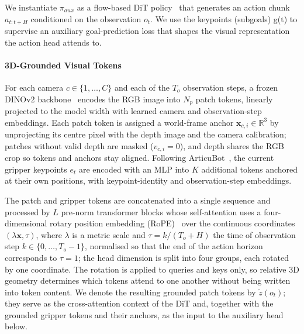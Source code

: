\documentclass[letterpaper, 10 pt, conference]{ieeeconf}  %
\begin{document}
We instantiate $\pi_{aux}$ as a flow-based DiT policy~\cite{dit,flowmatching,groot} that generates an action chunk $a_{t:t+H}$ conditioned on the observation $o_t$. We use the keypoints (subgoals) g(t) to supervise an auxiliary goal-prediction loss that shapes the visual representation the action head attends to. 

\paragraph{\textbf{3D-Grounded Visual Tokens}}
For each camera $c\in\{1,\dots,C\}$ and each of the $T_o$ observation steps, a frozen DINOv2
backbone~\cite{dinov2} encodes the RGB image into $N_p$ patch tokens, linearly
projected to the model width with learned camera and observation-step
embeddings. Each patch token is assigned a world-frame anchor
$\mathbf{x}_{c,i}\in\mathbb{R}^3$ by unprojecting its centre pixel with the
depth image and the camera calibration; patches without valid depth are masked
($v_{c,i}=0$), and depth shares the RGB crop so tokens and anchors stay
aligned. Following ArticuBot~\cite{articubot}, the current gripper keypoints
$e_t$ are encoded with an MLP into $K$ additional tokens anchored at their own
positions, with keypoint-identity and observation-step embeddings.

The patch and gripper tokens are concatenated into a single sequence and processed by $L$
pre-norm transformer blocks whose self-attention uses a four-dimensional rotary position
embedding (RoPE)~\cite{rope} over the continuous coordinates $(\lambda\mathbf{x},\tau)$,
where $\lambda$ is a metric scale and $\tau=k/(T_o+H)$ the time of observation step
$k\in\{0,\dots,T_o-1\}$, normalised so that the end of the action horizon corresponds to
$\tau=1$; the head
dimension is split into four groups, each rotated by one coordinate. The rotation is
applied to queries and keys only, so relative 3D geometry determines which tokens attend
to one another without being written into token content. We denote the resulting grounded
patch tokens by $\tilde{z}(o_t)$; they serve as the cross-attention context of the DiT and,
together with the grounded gripper tokens and their anchors, as the input to the auxiliary
head below.
\end{document}
